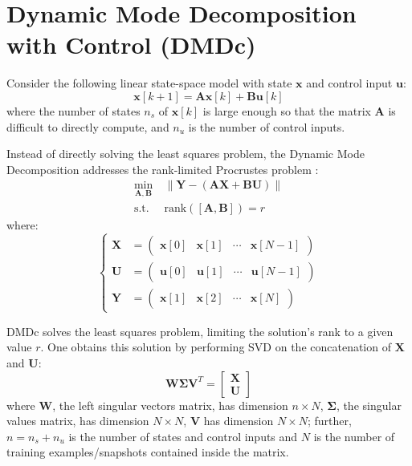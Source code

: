 \section{Dynamic Mode Decomposition with Control (DMDc)}\label{sec:dmdc}

Consider the following linear state-space model with state $\mathbf{x}$ and control input $\mathbf{u}$:
\begin{equation}
    \mathbf{x}[k+1] = \mathbf{A}\mathbf{x}[k] + \mathbf{B}\mathbf{u}[k]
        \label{eq:DMCc:full-state:dyn}
\end{equation}
where the number of states $n_s$ of $\mathbf{x}[k]$ is large enough so that the matrix $\mathbf{A}$ is difficult to directly compute, and $n_u$ is the number of control inputs.

Instead of directly solving the least squares problem, the Dynamic Mode Decomposition addresses the rank-limited Procrustes problem \cite{DMDc}:
\begin{subequations} \label{eqn:procustes}
\begin{align}
    \min_{\mathbf{A},\mathbf{B}} ~&\| \mathbf{Y} - (\mathbf{A}\mathbf{X} + \mathbf{B}\mathbf{U})\|\\
    \text{s.t.} ~~&  \text{rank}(\left[\mathbf{A},\mathbf{B}\right]) = r
\end{align}
\end{subequations}
%
where:
\begin{equation}
\left \{ \begin{aligned}
    \mathbf{X} &=
    \begin{pmatrix}
    \mathbf{x}[0] & \mathbf{x}[1] & \cdots & \mathbf{x}[N-1] 
    \end{pmatrix}\\
    \mathbf{U} &=
    \begin{pmatrix}
    \mathbf{u}[0] & \mathbf{u}[1] & \cdots & \mathbf{u}[N-1] 
    \end{pmatrix}\\
    \mathbf{Y} &=
    \begin{pmatrix}
    \mathbf{x}[1] & \mathbf{x}[2] & \cdots & \mathbf{x}[N] 
    \end{pmatrix}
\end{aligned} \right . \label{eq:def:X-U-Y}
\end{equation}

DMDc solves the least squares problem, limiting the solution's rank to a given value $r$.
%
One obtains this solution by performing SVD on the concatenation of $\mathbf{X}$ and $\mathbf{U}$:
\begin{equation}
    \mathbf{W}\mathbf{\Sigma}\mathbf{V}^T =
    \begin{bmatrix}
        \mathbf{X}\\
        \mathbf{U}
    \end{bmatrix}
\end{equation}
where $\mathbf{W}$, the left singular vectors matrix, has dimension $n \times N$, $\mathbf{\Sigma}$, the singular values matrix, has dimension $N \times N$, $\mathbf{V}$ has dimension $N \times N$; further, $n=n_s+n_u$ is the number of states and control inputs and $N$ is the number of training examples/snapshots contained inside the matrix.

